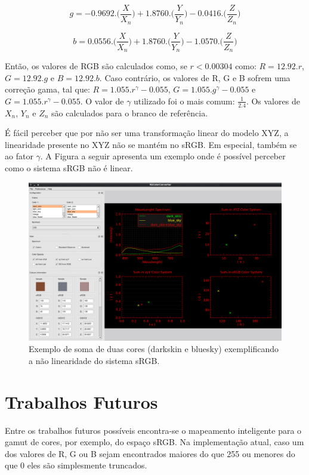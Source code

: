 \documentclass[a4paper,10pt]{report}
\begin{document}
\begin{equation}\label{eq:sRGB_g}
g=-0.9692.\Big(\frac{X}{X_n}\Big)+1.8760.\Big(\frac{Y}{Y_n}
\Big)-0.0416.\Big(\frac{Z}{Z_n}\Big)
\end{equation}

\begin{equation}\label{eq:sRGB_b}
b=0.0556.\Big(\frac{X}{X_n}\Big)+1.8760.\Big(\frac{Y}{Y_n}
\Big)-1.0570.\Big(\frac{Z}{Z_n}\Big)
\end{equation}

\par
Então, os valores de RGB são calculados como, se $ r < 0.00304 $ como:
$R=12.92.r$, $G=12.92.g$ e $B=12.92.b$. Caso contrário, os valores de R, G e B
sofrem uma correção gama, tal que: $R=1.055.r^\gamma-0.055$,
$G=1.055.g^\gamma-0.055$ e $G=1.055.r^\gamma-0.055$. O valor de $\gamma$
utilizado foi o mais comum: $\frac{1}{2.4}$. Os valores de $X_n$, $Y_n$ e $Z_n$
são calculados para o branco de referência.

\par
É fácil perceber que por não ser uma transformação linear do modelo XYZ, a
linearidade presente no XYZ não se mantém no sRGB. Em especial, também se ao
fator $\gamma$. A Figura a seguir apresenta um exemplo onde é possível
perceber como o sistema sRGB não é linear.

\begin{figure}[!htb]
     \centering
     \includegraphics[scale=0.6]{img/srgb_no_linearity.png}
     \caption{Exemplo de soma de duas cores (darkskin e bluesky)
exemplificando a não linearidade do sistema sRGB.}
     \label{fig:luv_no_linearity}
\end{figure}

\section{Trabalhos Futuros}
\par
Entre os trabalhos futuros possíveis encontra-se o mapeamento inteligente para o
gamut de cores, por exemplo, do espaço sRGB. Na implementação atual, caso um
dos valores de R, G ou B sejam encontrados maiores do que 255 ou menores do que
0 eles são simplesmente truncados.
\end{document}
